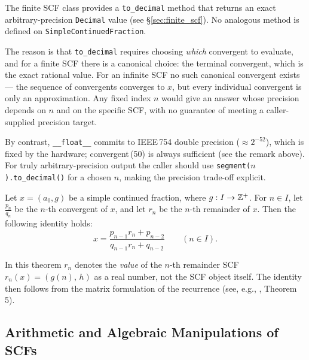 \begin{remark}
  The finite SCF class provides a \texttt{to\_decimal} method that returns an
  exact arbitrary-precision \texttt{Decimal} value (see
  \S\ref{sec:finite_scf}).  No analogous method is defined on
  \texttt{SimpleContinuedFraction}.

  The reason is that \texttt{to\_decimal} requires choosing \emph{which}
  convergent to evaluate, and for a finite SCF there is a canonical choice:
  the terminal convergent, which is the exact rational value.
  For an infinite SCF no such canonical convergent exists — the sequence of
  convergents converges to $x$, but every individual convergent is only an
  approximation.  Any fixed index $n$ would give an answer whose precision
  depends on $n$ and on the specific SCF, with no guarantee of meeting
  a caller-supplied precision target.

  By contrast, \texttt{\_\_float\_\_} commits to IEEE\,754 double precision
  ($\approx 2^{-52}$), which is fixed by the hardware; convergent\,(50) is
  always sufficient (see the remark above).  For truly arbitrary-precision
  output the caller should use \texttt{segment($n$).to\_decimal()} for a
  chosen $n$, making the precision trade-off explicit.
\end{remark}

\begin{theorem}
    Let $x = (a_0, g)$ be a simple continued fraction, where $g: I \to \mathbb{Z}^+$. 
    For $n \in I$, let $\frac{p_n}{q_n}$ be the $n$-th convergent of $x$, and let $r_n$ be the $n$-th
    remainder of $x$. Then the following identity holds:
    \[
        x = \frac{p_{n-1}r_n + p_{n-2}}{q_{n-1}r_n + q_{n-2}} \qquad (n \in I).
    \]
\end{theorem}

\begin{remark}
  In this theorem $r_n$ denotes the \emph{value} of the $n$-th remainder SCF
  $r_n(x) = (g(n),\, h)$ as a real number, not the SCF object itself.
  The identity then follows from the matrix formulation of the recurrence
  (see, e.g., \cite{khinchin1964}, Theorem 5).
\end{remark}

\subsection{Arithmetic and Algebraic Manipulations of SCFs}

